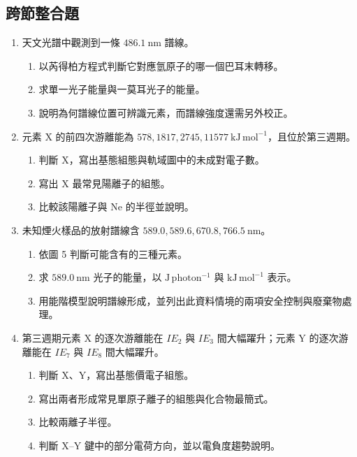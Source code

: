 \documentclass[11pt,a4paper]{article}
\providecommand{\tightlist}{%
  \setlength{\itemsep}{0pt}\setlength{\parskip}{0pt}}
\begin{document}
\subsection{跨節整合題}\label{ux8de8ux7bc0ux6574ux5408ux984c}

\begin{enumerate}
\def\labelenumi{\arabic{enumi}.}
\setcounter{enumi}{12}
\tightlist
\item
  天文光譜中觀測到一條 \(486.1\ \mathrm{nm}\) 譜線。

  \begin{enumerate}
  \def\labelenumii{\arabic{enumii}.}
  \tightlist
  \item
    以芮得柏方程式判斷它對應氫原子的哪一個巴耳末轉移。
  \item
    求單一光子能量與一莫耳光子的能量。
  \item
    說明為何譜線位置可辨識元素，而譜線強度還需另外校正。
  \end{enumerate}
\item
  元素 X 的前四次游離能為 \(578,1817,2745,11577\ \mathrm{kJ\,mol^{-1}}\)，且位於第三週期。

  \begin{enumerate}
  \def\labelenumii{\arabic{enumii}.}
  \tightlist
  \item
    判斷 X，寫出基態組態與軌域圖中的未成對電子數。
  \item
    寫出 X 最常見陽離子的組態。
  \item
    比較該陽離子與 Ne 的半徑並說明。
  \end{enumerate}
\item
  未知煙火樣品的放射譜線含 \(589.0,589.6,670.8,766.5\ \mathrm{nm}\)。

  \begin{enumerate}
  \def\labelenumii{\arabic{enumii}.}
  \tightlist
  \item
    依圖 5 判斷可能含有的三種元素。
  \item
    求 \(589.0\ \mathrm{nm}\) 光子的能量，以 \(\mathrm{J\,photon^{-1}}\) 與 \(\mathrm{kJ\,mol^{-1}}\) 表示。
  \item
    用能階模型說明譜線形成，並列出此資料情境的兩項安全控制與廢棄物處理。
  \end{enumerate}
\item
  第三週期元素 X 的逐次游離能在 \(IE_2\) 與 \(IE_3\) 間大幅躍升；元素 Y 的逐次游離能在 \(IE_7\) 與 \(IE_8\) 間大幅躍升。

  \begin{enumerate}
  \def\labelenumii{\arabic{enumii}.}
  \tightlist
  \item
    判斷 X、Y，寫出基態價電子組態。
  \item
    寫出兩者形成常見單原子離子的組態與化合物最簡式。
  \item
    比較兩離子半徑。
  \item
    判斷 X--Y 鍵中的部分電荷方向，並以電負度趨勢說明。
  \end{enumerate}
\end{enumerate}
\end{document}
